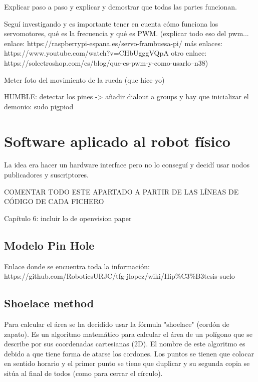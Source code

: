 Explicar paso a paso y explicar y demostrar que todas las partes funcionan.

Seguí investigando y es importante tener en cuenta cómo funciona los servomotores, qué es la frecuencia y qué es PWM. (explicar todo eso del pwm... enlace: https://raspberrypi-espana.es/servo-frambuesa-pi/   más enlaces: https://www.youtube.com/watch?v=CHbUgggVQpA   otro enlace: https://solectroshop.com/es/blog/que-es-pwm-y-como-usarlo--n38)

Meter foto del movimiento de la rueda (que hice yo)


HUMBLE: detectar los pines -> añadir dialout a groups y hay que inicializar el demonio: sudo pigpiod


\section{Software aplicado al robot físico}
\label{sec:softwarerf}

La idea era hacer un hardware interface pero no lo conseguí y decidí usar nodos publicadores y suscriptores.

COMENTAR TODO ESTE APARTADO A PARTIR DE LAS LÍNEAS DE CÓDIGO DE CADA FICHERO  




Capítulo 6: incluir lo de openvision paper\\

\subsection{Modelo Pin Hole}
\label{subsec:softwarepinhole}

Enlace donde se encuentra toda la información: https://github.com/RoboticsURJC/tfg-jlopez/wiki/Hip\%C3\%B3tesis-suelo

\subsection{Shoelace method}
\label{subsec:softwareshoelace}



Para calcular el área se ha decidido usar la fórmula "shoelace" (cordón de zapato). Es un algoritmo matemático para calcular el área de un polígono que se describe por sus coordenadas cartesianas (2D). El nombre de este algoritmo es debido a que tiene forma de atarse los cordones. Los puntos se tienen que colocar en sentido horario y el primer punto se tiene que duplicar y su segunda copia se sitúa al final de todos (como para cerrar el círculo).

